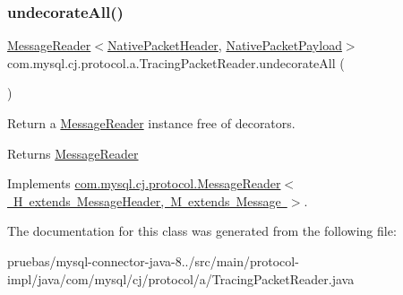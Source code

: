 \subsubsection{\texorpdfstring{undecorate\+All()}{undecorateAll()}}
{\footnotesize\ttfamily \mbox{\hyperlink{interfacecom_1_1mysql_1_1cj_1_1protocol_1_1_message_reader}{Message\+Reader}}$<$\mbox{\hyperlink{classcom_1_1mysql_1_1cj_1_1protocol_1_1a_1_1_native_packet_header}{Native\+Packet\+Header}}, \mbox{\hyperlink{classcom_1_1mysql_1_1cj_1_1protocol_1_1a_1_1_native_packet_payload}{Native\+Packet\+Payload}}$>$ com.\+mysql.\+cj.\+protocol.\+a.\+Tracing\+Packet\+Reader.\+undecorate\+All (\begin{DoxyParamCaption}{ }\end{DoxyParamCaption})}

Return a \mbox{\hyperlink{interfacecom_1_1mysql_1_1cj_1_1protocol_1_1_message_reader}{Message\+Reader}} instance free of decorators.

\begin{DoxyReturn}{Returns}
\mbox{\hyperlink{interfacecom_1_1mysql_1_1cj_1_1protocol_1_1_message_reader}{Message\+Reader}} 
\end{DoxyReturn}


Implements \mbox{\hyperlink{interfacecom_1_1mysql_1_1cj_1_1protocol_1_1_message_reader_a22a326215a91e4d7bff08d1f2c3e1b6d}{com.\+mysql.\+cj.\+protocol.\+Message\+Reader$<$ H extends Message\+Header, M extends Message $>$}}.



The documentation for this class was generated from the following file\+:\begin{DoxyCompactItemize}
\item 
pruebas/mysql-\/connector-\/java-\/8../src/main/protocol-\/impl/java/com/mysql/cj/protocol/a/Tracing\+Packet\+Reader.\+java\end{DoxyCompactItemize}
